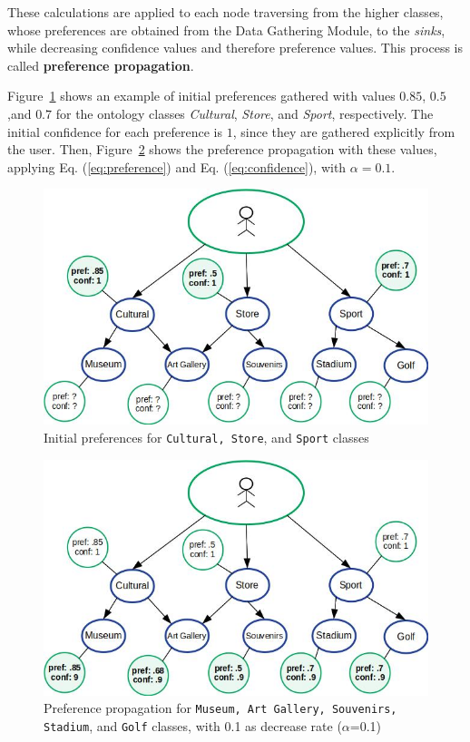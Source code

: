 These calculations are applied to each node traversing from the higher classes, whose preferences are obtained from the Data Gathering Module, to the \textit{sinks}, while decreasing confidence values and therefore preference values. 
This process is called \textbf{preference propagation}. 

Figure~\ref{fig:initial_pref} shows an example of initial preferences gathered with values $0.85$, $0.5$ ,and $0.7$ for the 
ontology classes \textit{Cultural}, \textit{Store}, and \textit{Sport}, respectively. The initial confidence for each preference is $1$, since they are gathered explicitly from the user. Then, Figure~\ref{fig:pref_prop} shows the preference propagation with these values, applying Eq. (\ref{eq:preference}) and Eq. (\ref{eq:confidence}), with $\alpha = 0.1$.

\begin{figure}[h]
\centering
\includegraphics[scale=0.5]{draws/initial_pref.jpg}
\caption{Initial preferences for {\tt Cultural, Store}, and {\tt Sport} classes}
\label{fig:initial_pref}
\end{figure}

\begin{figure}[h]
\centering
\includegraphics[scale=0.5]{draws/pref_spred.jpg}
\caption{Preference propagation for {\tt Museum, Art Gallery, Souvenirs, Stadium}, and {\tt Golf} classes, with 0.1 as decrease rate ($\alpha$=0.1)}
\label{fig:pref_prop}
\end{figure}

